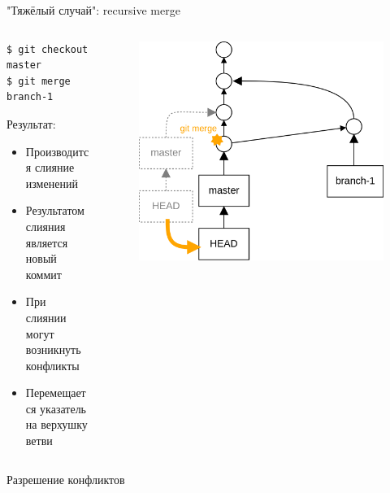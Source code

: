 \documentclass[presentation]{beamer}
\begin{document}
\begin{frame}[fragile]{"Тяжёлый случай": recursive merge}
  \begin{columns}
    \begin{column}{.4\textwidth}
\begin{verbatim}
$ git checkout master
$ git merge branch-1
\end{verbatim}
      Результат:
      \begin{itemize}
      \item Производится слияние изменений
      \item Результатом слияния является новый коммит
      \item При слиянии могут возникнуть конфликты
      \item Перемещается указатель на верхушку ветви
      \end{itemize}
      \end{column}
      \begin{column}{.6\textwidth}
        \begin{figure}[htb]
          \centering
          \includegraphics[height=.7\textheight]{git-operation-merge-2}
        \end{figure}
      \end{column}
    \end{columns}
\end{frame}

\begin{frame}{Разрешение конфликтов}

\end{frame}
\end{document}
